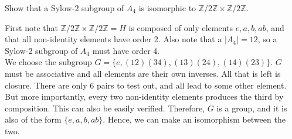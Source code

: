 \documentclass{scrartcl}
\begin{document}
\begin{problem}[7]
    Show that a Sylow-2 subgroup of $A_4$ is isomorphic to $\mathbb{Z}/2\mathbb{Z} \times \mathbb{Z}/2\mathbb{Z}$.
\end{problem}

\begin{soln}
    First note that $\mathbb{Z}/2\mathbb{Z} \times \mathbb{Z}/2\mathbb{Z}=H$ is composed of only elements $e, a, b, ab$, and that all non-identity elements have order 2. Also note that a $|A_4| = 12$, so a Sylow-2 subgroup of $A_4$ must have order 4. \\
    We choose the subgroup $G = \{ e, (12)(34), (13)(24), (14)(23) \}$. $G$ must be associative and all elements are their own inverses. All that is left is closure. There are only $6$ pairs to test out, and all lead to some other element. But more importantly, every two non-identity elements produces the third by composition. This can also be easily verified. Therefore, $G$ is a group, and it is also of the form $\{ e, a, b, ab \}$. Hence, we can make an isomorphism between the two.  
\end{soln}
\end{document}
